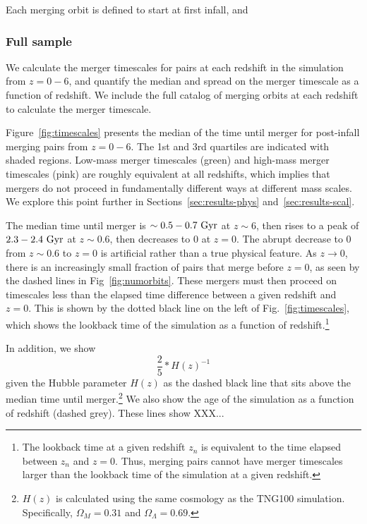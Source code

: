 \documentclass[twocolumn,linenumbers]{aastex631}
\begin{document}
    Each merging orbit is defined to start at first infall, and 
    


    \subsubsection{Full sample}
        We calculate the merger timescales for pairs at each redshift in the simulation from $z=0-6$, and quantify the median and spread on the merger timescale as a function of redshift. 
        We include the full catalog of merging orbits at each redshift to calculate the merger timescale. 
        
        Figure~\ref{fig:timescales} presents the median of the time until merger for post-infall merging pairs from $z=0-6$. 
        The 1st and 3rd quartiles are indicated with shaded regions. 
        Low-mass merger timescales (green) and high-mass merger timescales (pink) are roughly equivalent at all redshifts, which implies that mergers do not proceed in fundamentally different ways at different mass scales. 
        We explore this point further in Sections~\ref{sec:results-phys} and~\ref{sec:results-scal}.
        
        The median time until merger is $\sim0.5-0.7\,\mathrm{\,Gyr}$ at $z\sim6$, then rises to a peak of $2.3-2.4\,\mathrm{\,Gyr}$ at $z\sim0.6$, then decreases to 0 at $z=0$.
        The abrupt decrease to 0 from $z\sim0.6$ to $z=0$ is artificial rather than a true physical feature. 
        As $z\to0$, there is an increasingly small fraction of pairs that merge before $z=0$, as seen by the dashed lines in Fig~\ref{fig:numorbits}. 
        These mergers must then proceed on timescales less than the elapsed time difference between a given redshift and $z=0$. 
        This is shown by the dotted black line on the left of Fig.~\ref{fig:timescales}, which shows the lookback time of the simulation as a function of redshift.\footnote{The lookback time at a given redshift $z_n$ is equivalent to the time elapsed between $z_n$ and $z=0$. Thus, merging pairs cannot have merger timescales larger than the lookback time of the simulation at a given redshift.} %
        
        In addition, we show 
        \begin{equation}
        \frac{2}{5}*H(z)^{-1}
        \end{equation}
        given the Hubble parameter $H(z)$ as the dashed black line that sits above the median time until merger.\footnote{$H(z)$ is calculated using the same cosmology as the TNG100 simulation. Specifically, $\Omega_M=0.31$ and $\Omega_{\Lambda}=0.69$.}
        We also show the age of the simulation as a function of redshift (dashed grey). 
        These lines show XXX...
    
\end{document}
